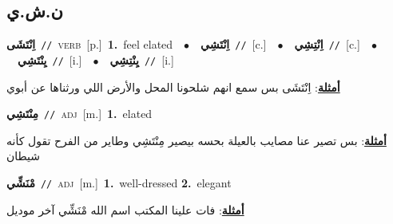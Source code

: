 \documentclass[10pt,a4paper,twoside]{article} %
\begin{document}
\begin{multicols}{2}
\vspace{-3mm}
\subsection*{\color{blue}\foreignlanguage{arabic}{ن.ش.ي}\color{blue}{}} 

{\setlength\topsep{0pt}\textbf{\foreignlanguage{arabic}{اِنْتَشَى}}\ {\color{gray}\texttt{//}\color{black}}\ \textsc{verb}\ [p.]\ \textbf{1.}~feel elated\ \ $\bullet$\ \ \setlength\topsep{0pt}\textbf{\foreignlanguage{arabic}{اِنْتَشِي}}\ {\color{gray}\texttt{//}\color{black}}\ [c.]\ \ $\bullet$\ \ \setlength\topsep{0pt}\textbf{\foreignlanguage{arabic}{اِنْتِشِي}}\ {\color{gray}\texttt{//}\color{black}}\ [c.]\ \ $\bullet$\ \ \setlength\topsep{0pt}\textbf{\foreignlanguage{arabic}{يِنْتَشِي}}\ {\color{gray}\texttt{//}\color{black}}\ [i.]\ \ $\bullet$\ \ \setlength\topsep{0pt}\textbf{\foreignlanguage{arabic}{يِنْتِشِي}}\ {\color{gray}\texttt{//}\color{black}}\ [i.]\  \begin{flushright}\color{gray}\foreignlanguage{arabic}{\textbf{\underline{\foreignlanguage{arabic}{أمثلة}}}: اِنْتَشَى بس سمع انهم شلحونا المحل والأرض اللي ورثناها عن أبوي}\end{flushright}\color{black}} \vspace{2mm}

{\setlength\topsep{0pt}\textbf{\foreignlanguage{arabic}{مِنْتَشِي}}\ {\color{gray}\texttt{//}\color{black}}\ \textsc{adj}\ [m.]\ \textbf{1.}~elated\  \begin{flushright}\color{gray}\foreignlanguage{arabic}{\textbf{\underline{\foreignlanguage{arabic}{أمثلة}}}: بس تصير عنا مصايب بالعيلة بحسه بيصير مِنْتَشِي وطاير من الفرح تقول كأنه شيطان}\end{flushright}\color{black}} \vspace{2mm}

{\setlength\topsep{0pt}\textbf{\foreignlanguage{arabic}{مْنَشِّي}}\ {\color{gray}\texttt{//}\color{black}}\ \textsc{adj}\ [m.]\ \textbf{1.}~well-dressed  \textbf{2.}~elegant\  \begin{flushright}\color{gray}\foreignlanguage{arabic}{\textbf{\underline{\foreignlanguage{arabic}{أمثلة}}}: فات علينا المكتب اسم الله مْنَشِّي آخر موديل}\end{flushright}\color{black}} \vspace{2mm}


\end{multicols}
\end{document}
